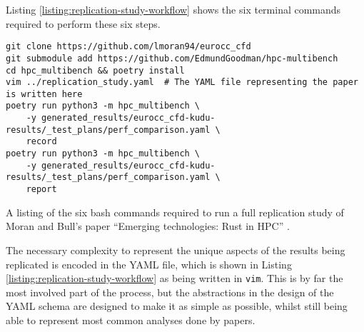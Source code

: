 Listing \ref{listing:replication-study-workflow} shows the six terminal commands required to perform these six steps.

\begin{listing}[H]
    \begin{verbatim}
git clone https://github.com/lmoran94/eurocc_cfd
git submodule add https://github.com/EdmundGoodman/hpc-multibench
cd hpc_multibench && poetry install
vim ../replication_study.yaml  # The YAML file representing the paper is written here
poetry run python3 -m hpc_multibench \
    -y generated_results/eurocc_cfd-kudu-results/_test_plans/perf_comparison.yaml \
    record
poetry run python3 -m hpc_multibench \
    -y generated_results/eurocc_cfd-kudu-results/_test_plans/perf_comparison.yaml \
    report
    \end{verbatim}
    \caption{A listing of the six bash commands required to run a full replication study of Moran and Bull's paper ``Emerging technologies: Rust in HPC'' \cite{moranEmergingTechnologiesRust2023}.}
    \label{listing:replication-study-workflow}
\end{listing}

The necessary complexity to represent the unique aspects of the results being replicated is encoded in the YAML file, which is shown in Listing \ref{listing:replication-study-workflow} as being written in \texttt{vim}. This is by far the most involved part of the process, but the abstractions in the design of the YAML schema are designed to make it as simple as possible, whilst still being able to represent most common analyses done by papers.



